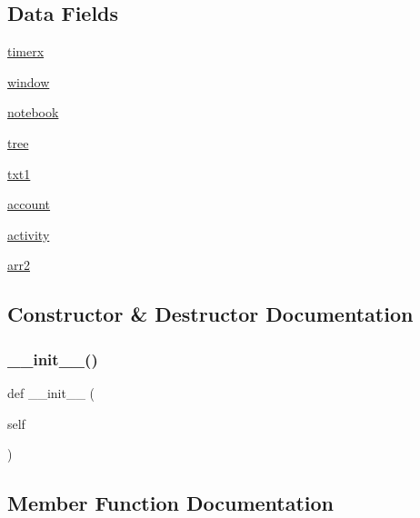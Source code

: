 \subsection*{Data Fields}
\begin{DoxyCompactItemize}
\item 
\hyperlink{classdibagui_1_1_main_win_a1c3467ffffd2715943d16338156f1ef6}{timerx}
\item 
\hyperlink{classdibagui_1_1_main_win_a04a8a2bbfa9c15500892b8e5033d625b}{window}
\item 
\hyperlink{classdibagui_1_1_main_win_a9d9c279569f959f553951502d6a93194}{notebook}
\item 
\hyperlink{classdibagui_1_1_main_win_a76dbcfc78e812394f40977b0e13a3a47}{tree}
\item 
\hyperlink{classdibagui_1_1_main_win_a35543500c72c1c9eff1393f605e5ca10}{txt1}
\item 
\hyperlink{classdibagui_1_1_main_win_a3f3fcd00f4a6b97fbf9edcfa86d9607b}{account}
\item 
\hyperlink{classdibagui_1_1_main_win_a54f1d8208fc901f0d590d129e0fe4af7}{activity}
\item 
\hyperlink{classdibagui_1_1_main_win_a985893871a16e46a58441e60dc9da89f}{arr2}
\end{DoxyCompactItemize}


\subsection{Constructor \& Destructor Documentation}
\mbox{\label{classdibagui_1_1_main_win_ae64f0875afe3067b97ba370b354b9213}} 
\subsubsection{\texorpdfstring{\+\_\+\+\_\+init\+\_\+\+\_\+()}{\_\_init\_\_()}}
{\footnotesize\ttfamily def \+\_\+\+\_\+init\+\_\+\+\_\+ (\begin{DoxyParamCaption}\item[{}]{self }\end{DoxyParamCaption})}



\subsection{Member Function Documentation}
\mbox{\label{classdibagui_1_1_main_win_a4802385c549037f5813de35842fcbd55}} 
